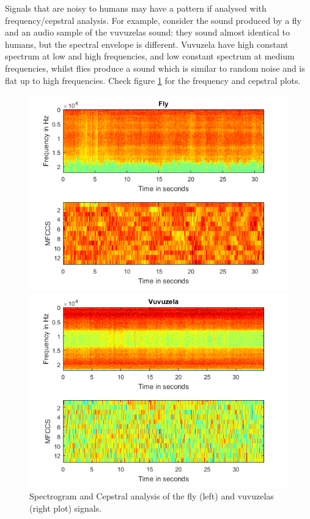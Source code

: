 Signals that are noisy to humans may have a pattern if analysed with frequency/cepstral analysis. For example, consider the sound produced by a fly and an audio sample of the vuvuzelas sound: they sound almost identical to humans, but the spectral envelope is different. Vuvuzela have high constant spectrum at low and high frequencies, and low constant spectrum at medium frequencies, whilst flies produce a sound which is similar to random noise and is flat up to high frequencies. Check figure \ref{fig:fly_vuvuzela} for the frequency and cepstral plots.
\pagebreak
\begin{figure}[h]
\centering
\begin{minipage}{.5\textwidth}
  \centering
  \includegraphics[width=1\linewidth]{./images/fly.png}
\end{minipage}%
\begin{minipage}{.5\textwidth}
  \centering
  \includegraphics[width=1\linewidth]{./images/vuvuzela.png}
\end{minipage}
 \caption{Spectrogram and Cepstral analysis of the fly (left) and vuvuzelas (right plot) signals.}
 \label{fig:fly_vuvuzela}	
\end{figure}
